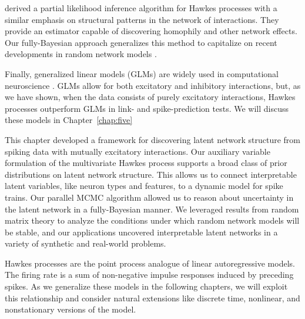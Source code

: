 \citet{Perry-2013} derived a partial likelihood inference algorithm
for Hawkes processes with a similar emphasis on structural patterns in
the network of interactions. They provide an estimator capable of
discovering homophily
and other network effects. Our fully-Bayesian approach generalizes
this method to capitalize on recent developments in random network
models \citep{Lloyd-2012}.

Finally, generalized linear models (GLMs) are widely used in
computational neuroscience \citep{Paninski-2004}. GLMs allow for both
excitatory and inhibitory interactions, but, as we have shown, when
the data consists of purely excitatory interactions, Hawkes processes
outperform GLMs in link- and spike-prediction tests. We will discuss
these models in Chapter~\ref{chap:five}

This chapter developed a framework for discovering latent network
structure from spiking data with mutually excitatory interactions. Our
auxiliary variable formulation of the multivariate Hawkes process
supports a broad class of prior distributions on latent network
structure. This allows us to connect interpretable latent variables,
like neuron types and features, to a dynamic model for spike trains.
Our parallel MCMC algorithm allowed us to reason about uncertainty in
the latent network in a fully-Bayesian manner.  We leveraged results
from random matrix theory to analyze the conditions under which random
network models will be stable, and our applications uncovered
interpretable latent networks in a variety of synthetic and real-world
problems.

Hawkes processes are the point process analogue of linear autoregressive
models. The firing rate is a sum of non-negative impulse responses induced
by preceding spikes. As we generalize these models in the following
chapters, we will exploit this relationship and consider natural extensions
like discrete time, nonlinear, and nonstationary versions of the model.



